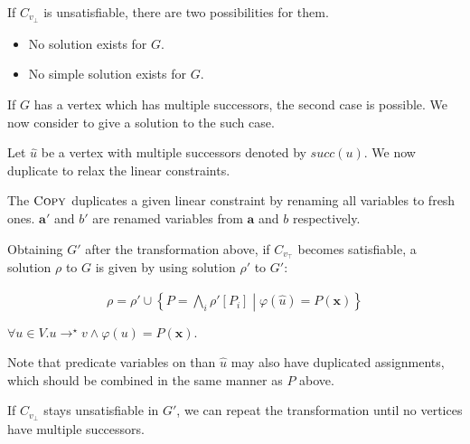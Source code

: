 \documentclass[a4paper,12pt]{article}
\newcommand{\path}[2]{#1\rightarrow^\star#2}
\begin{document}
If $C_{v_\bot}$ is unsatisfiable, there are two possibilities for them.

\begin{itemize}
\item No solution exists for $G$.
\item No simple solution exists for $G$.
\end{itemize}

If $G$ has a vertex which has multiple successors, the second case is
possible. We now consider to give a solution to the such case.

Let $\hat u$ be a vertex with multiple successors denoted by
$succ(u)$. We now duplicate to relax the linear constraints.





The $\textsc{Copy}$ duplicates a given linear constraint by renaming
all variables to fresh ones. $\mathbf{a'}$ and $b'$ are renamed
variables from $\mathbf{a}$ and $b$ respectively.

Obtaining $G'$ after the transformation above, if $C_{v_\top}$ becomes
satisfiable, a solution $\rho$ to $G$ is given by using solution
$\rho'$ to $G'$:

\begin{align*}
 \rho = \rho' \cup \left\lbrace P = \bigwedge_i \rho'[P_i] \middle|
 \varphi(\hat u) = P(\mathbf{x}) \right\rbrace
\end{align*}

$\forall u \in V. \path{u}{v} \wedge \varphi(u) = P(\mathbf{x}).
$

Note that predicate variables on  than $\hat u$ may
also have duplicated assignments, which should be combined in the
same manner as $P$ above.

If $C_{v_\bot}$ stays unsatisfiable in $G'$, we can repeat the
transformation until no vertices have multiple successors.
\end{document}

